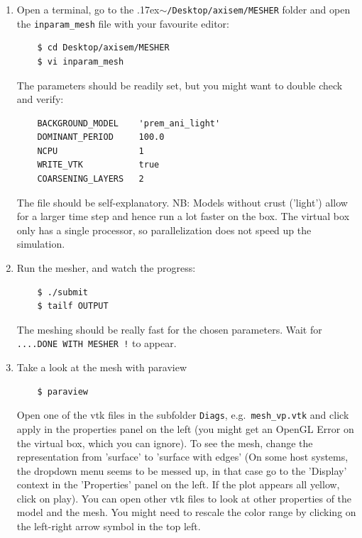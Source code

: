 \documentclass{article}
\newcommand{\ttilde}[0]{\raise.17ex\hbox{$\scriptstyle\sim$}}
\begin{document}
\begin{enumerate}
    \item Open a terminal, go to the \ttilde\verb|/Desktop/axisem/MESHER| folder and open
    the \verb|inparam_mesh| file with your favourite editor:
    \begin{verbatim}
    $ cd Desktop/axisem/MESHER
    $ vi inparam_mesh
    \end{verbatim}
    The parameters should be readily set, but you might want to double check and verify:
    \begin{verbatim}
    BACKGROUND_MODEL    'prem_ani_light'
    DOMINANT_PERIOD     100.0
    NCPU                1
    WRITE_VTK           true
    COARSENING_LAYERS   2
    \end{verbatim}
    The file should be self-explanatory. NB: Models without crust ('light') allow for a
    larger time step and hence run a lot faster on the box. The virtual box only has a
    single processor, so parallelization does not speed up the simulation.

    \item Run the mesher, and watch the progress:
    \begin{verbatim}
    $ ./submit
    $ tailf OUTPUT
    \end{verbatim}
    The meshing should be really fast for the chosen parameters. Wait for 
    \verb|....DONE WITH MESHER !| to appear.

    \item Take a look at the mesh with paraview
    \begin{verbatim}
    $ paraview
    \end{verbatim}
    Open one of the vtk files in the subfolder \verb|Diags|, e.g.\
    \verb|mesh_vp.vtk| and click apply in the properties panel on the left (you
    might get an OpenGL Error on the virtual box, which you can ignore). To see
    the mesh, change the representation from 'surface' to 'surface with edges'
    (On some host systems, the dropdown menu seems to be messed up, in that
    case go to the 'Display' context in the 'Properties' panel on the left. If
    the plot appears all yellow, click on play).  You can open other vtk files
    to look at other properties of the model and the mesh. You might need to
    rescale the color range by clicking on the left-right arrow symbol in the
    top left.


\end{enumerate}
\end{document}
